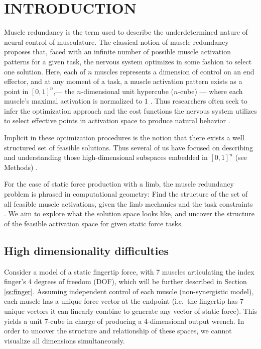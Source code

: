 
\section{INTRODUCTION}

Muscle redundancy is the term used to describe the underdetermined nature of neural control of musculature.
The classical notion of muscle redundancy  proposes that, faced with an infinite number of possible muscle activation patterns for a given task, the nervous system optimizes in some fashion to select one solution.
Here, each of $n$ muscles represents a dimension of control on an end effector, and at any moment of a task, a muscle activation pattern exists as a point in $[0,1]^n$,--- the $n$-dimensional unit hypercube ($n$-cube) --- where each muscle's maximal activation is normalized to $1$ \cite{Valero-Cuevas1998Large}.
Thus researchers often seek to infer the optimization approach and the cost functions the nervous system utilizes to select effective points in activation space to produce natural behavior \cite{Chao1978Graphical,Prilutsky2000Muscle,scott2004optimal,todorov2002optimal,crowninshield1981physiologically,higginson2005simulated}. 

Implicit in these optimization procedures is the notion that there exists a well structured set of feasible solutions. Thus several of us have focused on describing and understanding those high-dimensional subspaces  embedded in $[0,1]^n$ (see Methods) \cite{kutch2011muscle,kutch2012challenges,sohn2013cat_bounding_box,Valero-Cuevas1998Large,Valero-Cuevas2015high-dimensional}.

For the case of static force production with a limb, the muscle redundancy problem is phrased in computational geometry: Find the structure of the set of all feasible muscle activations, given the limb mechanics and the task constraints \cite{avis1992Pivoting,Valero-Cuevas1998Large,Valero-Cuevas2009mathematical,Valero-Cuevas2015high-dimensional}. We aim to explore what the solution space looks like, and uncover the structure of the feasible activation space for given static force tasks.

\subsection{High dimensionality difficulties}
Consider a model of a static fingertip force, with 7 muscles articulating the index finger's 4 degrees of freedom (DOF), which will be further described in Section \ref{ss:finger}.
Assuming independent control of each muscle (non-synergistic model), each muscle has a unique force vector at the endpoint (i.e.\ the fingertip has 7 unique vectors it can linearly combine to generate any vector of static force).
This yields a unit $7$-cube in charge of producing a 4-dimensional output wrench.
In order to uncover the structure and relationship of these spaces, we cannot visualize all dimensions simultaneously. %


